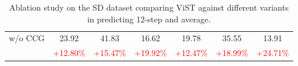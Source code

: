 \begin{table}[!ht]
{\begin{tabular}{l|ccc|ccc}
\hline
w/o CCG & 23.92 & 41.83 & 16.62 & 19.78 & 35.55 & 13.91 \\
 & \textcolor{red}{\small +12.80\%} & \textcolor{red}{\small +15.47\%} & \textcolor{red}{\small +19.92\%} & \textcolor{red}{\small +12.47\%} & \textcolor{red}{\small +18.99\%} & \textcolor{red}{\small +24.71\%} \\
\bottomrule
\end{tabular}
}
\caption{Ablation study on the SD dataset comparing ViST against different variants in predicting 12-step and average.
}
\label{tab:ablation}
\end{table}